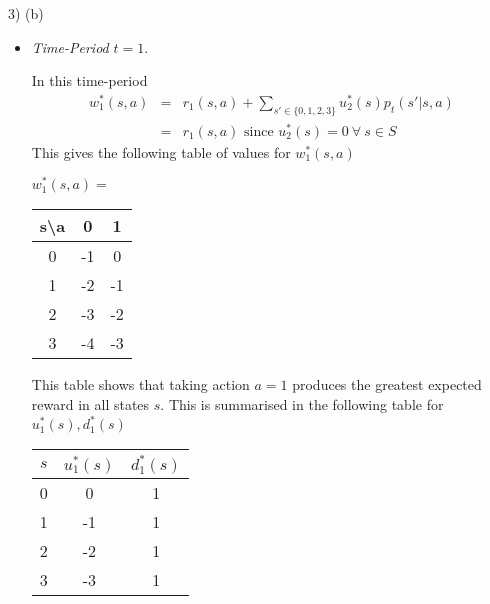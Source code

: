 \documentclass[11pt,a4paper]{article}
\begin{document}
\begin{answer}{3) (b)}
  \begin{itemize}
    \item \textit{Time-Period} $t=1$.
    \par In this time-period
    \[\begin{array}{rcl}
      w_1^*(s,a)&=&r_1(s,a)+\sum_{s'\in\{0,1,2,3\}}u_2^*(s)p_t(s'|s,a)\\
      &=&r_1(s,a)\text{ since }u_2^*(s)=0\ \forall\ s\in S
    \end{array}\]
    This gives the following table of values for $w_1^*(s,a)$
    \begin{center}
      $w_1^*(s,a)=$
      \begin{tabular}{c|cc}
        s\textbackslash a&0&1\\\hline
        0&-1&0\\
        1&-2&-1\\
        2&-3&-2\\
        3&-4&-3
      \end{tabular}
    \end{center}
    This table shows that taking action $a=1$ produces the greatest expected reward in all states $s$. This is summarised in the following table for $u_1^*(s),d_1^*(s)$
    \begin{center}
      \begin{tabular}{c|c|c}
        $s$&$u_1^*(s)$&$d_1^*(s)$\\\hline
        0&0&1\\
        1&-1&1\\
        2&-2&1\\
        3&-3&1
      \end{tabular}
    \end{center}


\end{itemize}
\end{answer}
\end{document}
